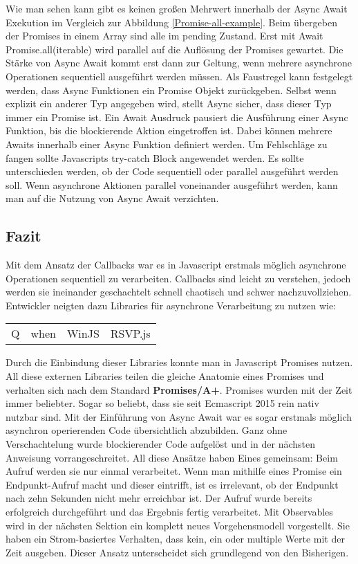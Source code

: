 \noindent
Wie man sehen kann gibt es keinen großen Mehrwert innerhalb der Async Await Exekution im Vergleich zur Abbildung \ref{Promise-all-example}. Beim übergeben der Promises in einem Array sind alle im pending Zustand. Erst mit Await Promise.all(iterable) wird parallel auf die Auflösung der Promises gewartet. Die Stärke von Async Await kommt erst dann zur Geltung, wenn mehrere asynchrone Operationen sequentiell ausgeführt werden müssen. Als Faustregel kann festgelegt werden, dass Async Funktionen ein Promise Objekt zurückgeben. Selbst wenn explizit ein anderer Typ angegeben wird, stellt Async sicher, dass dieser Typ immer ein Promise ist. Ein Await Ausdruck pausiert die Ausführung einer Async Funktion, bis die blockierende Aktion eingetroffen ist. Dabei können mehrere Awaits innerhalb einer Async Funktion definiert werden. Um Fehlschläge zu fangen sollte Javascripts try-catch Block angewendet werden. Es sollte unterschieden werden, ob der Code sequentiell oder parallel ausgeführt werden soll. Wenn asynchrone Aktionen parallel voneinander ausgeführt werden, kann man auf die Nutzung von Async Await verzichten.

\subsection{Fazit}

Mit dem Ansatz der Callbacks war es in Javascript erstmals möglich asynchrone Operationen sequentiell zu verarbeiten. Callbacks sind leicht zu verstehen, jedoch werden sie ineinander geschachtelt schnell chaotisch und schwer nachzuvollziehen. Entwickler neigten dazu Libraries für asynchrone Verarbeitung zu nutzen wie:

\begin{center}
\begin{tabular}{ l c c r }
  Q & when & WinJS & RSVP.js\\
\end{tabular}
\end{center}

\noindent
Durch die Einbindung dieser Libraries konnte man in Javascript Promises nutzen. All diese externen Libraries teilen die gleiche Anatomie eines Promises und verhalten sich nach dem Standard \textbf{Promises/A+}\cite{promises-a+}. Promises wurden mit der Zeit immer beliebter. Sogar so beliebt, dass sie seit Ecmascript 2015 rein nativ nutzbar sind. Mit der Einführung von Async Await war es sogar erstmals möglich asynchron operierenden Code übersichtlich abzubilden. Ganz ohne Verschachtelung wurde blockierender Code aufgelöst und in der nächsten Anweisung vorrangeschreitet. All diese Ansätze haben Eines gemeinsam: Beim Aufruf werden sie nur einmal verarbeitet. Wenn man mithilfe eines Promise ein Endpunkt-Aufruf macht und dieser eintrifft, ist es irrelevant, ob der Endpunkt nach zehn Sekunden nicht mehr erreichbar ist. Der Aufruf wurde bereits erfolgreich durchgeführt und das Ergebnis fertig verarbeitet. Mit Observables wird in der nächsten Sektion ein komplett neues Vorgehensmodell vorgestellt. Sie haben ein Strom-basiertes Verhalten, dass kein, ein oder multiple Werte mit der Zeit ausgeben. Dieser Ansatz unterscheidet sich grundlegend von den Bisherigen.
